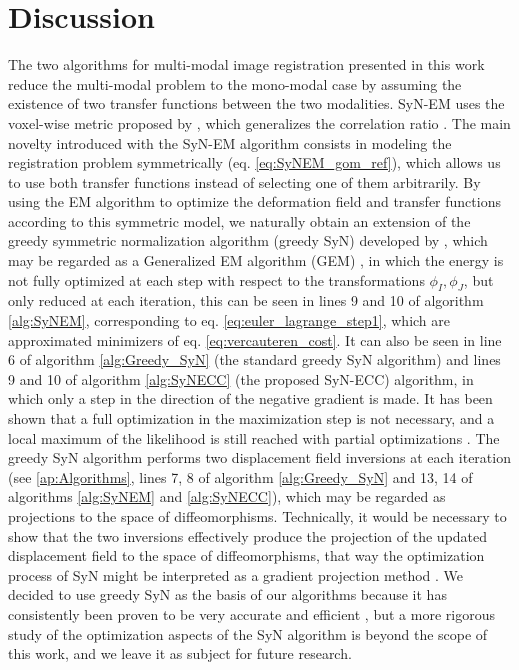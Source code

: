 \section{Discussion}
The two algorithms for multi-modal image registration presented in this work reduce the multi-modal problem to the mono-modal case by assuming the existence of two transfer functions between the two modalities. SyN-EM uses the voxel-wise metric proposed by \cite{Arce-santana2014}, which generalizes the correlation ratio \citep{Roche1998}. The main novelty introduced with the SyN-EM algorithm consists in modeling the registration problem symmetrically (eq. \eqref{eq:SyNEM_gom_ref}), which allows us to use both transfer functions instead of selecting one of them arbitrarily. By using the EM algorithm to optimize the deformation field and transfer functions according to this symmetric model, we naturally obtain an extension of the greedy symmetric normalization algorithm (greedy SyN) developed by \cite{Avants2008, Avants2011}, which may be regarded as a Generalized EM algorithm (GEM) \citep{Neal1998}, in which the energy is not fully optimized at each step with respect to the transformations $\phi_{I}, \phi_{J}$, but only reduced at each iteration, this can be seen in lines 9 and 10 of algorithm \ref{alg:SyNEM}, corresponding to eq. \eqref{eq:euler_lagrange_step1}, which are approximated minimizers of eq. \eqref{eq:vercauteren_cost}. It can also be seen in line 6 of algorithm \ref{alg:Greedy_SyN} (the standard greedy SyN algorithm) and lines 9 and 10 of algorithm \ref{alg:SyNECC} (the proposed SyN-ECC) algorithm, in which only a step in the direction of the negative gradient is made. It has been shown that a full optimization in the maximization step is not necessary, and a local maximum of the likelihood is still reached with partial optimizations \citep{Neal1998}. The greedy SyN algorithm performs two displacement field inversions at each iteration (see \ref{ap:Algorithms}, lines 7, 8 of algorithm \ref{alg:Greedy_SyN} and 13, 14 of algorithms \ref{alg:SyNEM} and \ref{alg:SyNECC}), which may be regarded as projections to the space of diffeomorphisms. Technically, it would be necessary to show that the two inversions effectively produce the projection of the updated displacement field to the space of diffeomorphisms, that way the optimization process of SyN might be interpreted as a gradient projection method \citep{Xiu2007}. We decided to use greedy SyN as the basis of our algorithms because it has consistently been proven to be very accurate and efficient \citep{Klein2009, Klein2010, Rohlfing2012}, but a more rigorous study of the optimization aspects of the SyN algorithm is beyond the scope of this work, and we leave it as subject for future research.\\

